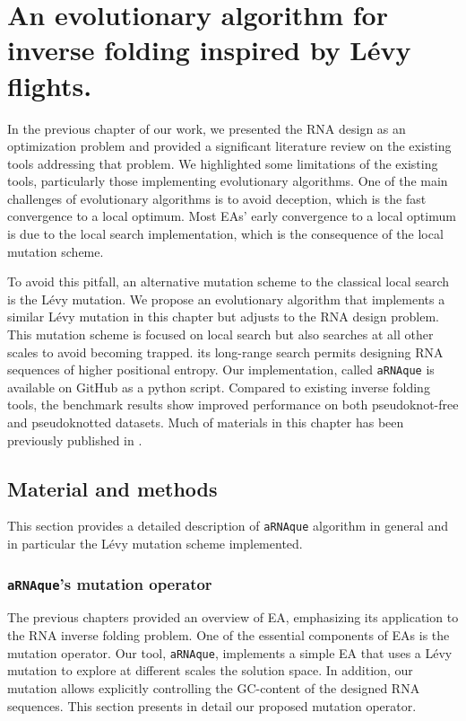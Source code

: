 \chapter{An evolutionary algorithm for inverse folding inspired by Lévy flights.}\label{ch:arnaque}

In the previous chapter of our work, we presented the \ac{RNA} design as an optimization problem and provided a significant literature review on the existing tools addressing that problem. We highlighted some limitations of the existing tools, particularly those implementing evolutionary algorithms. One of the main challenges of evolutionary algorithms is to avoid deception, which is the fast convergence to a local optimum. Most \acp{EA}' early convergence to a local optimum is due to the local search implementation, which is the consequence of the local mutation scheme. 

To avoid this pitfall, an alternative mutation scheme to the classical local search is the Lévy mutation. We propose an evolutionary algorithm that implements a similar Lévy mutation in this chapter but adjusts to the \ac{RNA} design problem. This mutation scheme is focused on local search but also searches at all other scales to avoid becoming trapped. its long-range search permits designing \ac{RNA} sequences of higher positional entropy. Our implementation, called \texttt{aRNAque} is available on GitHub as a python script. Compared to existing inverse folding tools, the benchmark results show improved performance on both pseudoknot-free and pseudoknotted datasets. Much of materials in this chapter has been previously published in \cite{merleau2021simple, merleau2022evolutionary}.

\section{Material and methods}

This section provides a detailed description of \texttt{aRNAque} algorithm in general and in particular the Lévy mutation scheme implemented. 

\subsection{\texttt{aRNAque}'s mutation operator}
The previous chapters provided an overview of \ac{EA}, emphasizing its application to the \ac{RNA} inverse folding problem. One of the essential components of \acp{EA} is the mutation operator. Our tool, \texttt{aRNAque}, implements a simple \ac{EA} that uses a Lévy mutation to explore at different scales the solution space. In addition, our mutation allows explicitly controlling the GC-content of the designed \ac{RNA} sequences. This section presents in detail our proposed mutation operator. 

